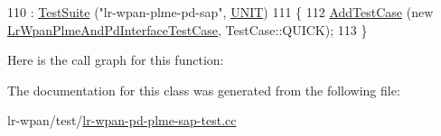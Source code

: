 \begin{DoxyCode}
110   : \hyperlink{classns3_1_1TestSuite_a904b0c40583b744d30908aeb94636d1a}{TestSuite} (\textcolor{stringliteral}{"lr-wpan-plme-pd-sap"}, \hyperlink{classns3_1_1TestSuite_a1ebfcab34ec8161e085e8e3a1855eae0a3885375a3787abf60431f8454b3cadbd}{UNIT})
111 \{
112   \hyperlink{classns3_1_1TestCase_a3718088e3eefd5d6454569d2e0ddd835}{AddTestCase} (\textcolor{keyword}{new} \hyperlink{classLrWpanPlmeAndPdInterfaceTestCase}{LrWpanPlmeAndPdInterfaceTestCase}, 
      TestCase::QUICK);
113 \}
\end{DoxyCode}


Here is the call graph for this function\+:




The documentation for this class was generated from the following file\+:\begin{DoxyCompactItemize}
\item 
lr-\/wpan/test/\hyperlink{lr-wpan-pd-plme-sap-test_8cc}{lr-\/wpan-\/pd-\/plme-\/sap-\/test.\+cc}\end{DoxyCompactItemize}
